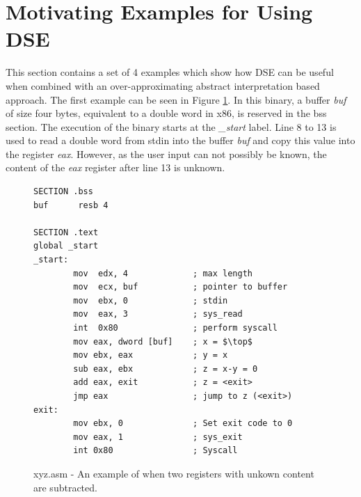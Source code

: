 \documentclass{kththesis}
\newcommand{\fbcomment}[1]{{#1}}
\renewcommand{\fbcomment}[1]{}
\renewcommand{\it}[1]{\textit{#1}}
\begin{document}


\section{Motivating Examples for Using DSE}\label{sec:MotExamples}
\fbcomment{\color{red}Goal: Provide 4 examples of when DSE can be useful. (Ex 1: A case that can be handled by DSE but not Jakstab. Ex 2: Why it is important to alternate multiple times between under and over-approximation, Ex 3: Why the second version has higher coverage. Ex 4: That the under-approximation can be useful even when there is a true top in a binary)}
This section contains a set of 4 examples which show how DSE can be useful when combined with an over-approximating abstract interpretation based approach. The first example can be seen in Figure \ref{fig:xyz.asm}. In this binary, a buffer \it{buf} of size four bytes, equivalent to a double word in x86, is reserved in the bss section. The execution of the binary starts at the \it{\_start} label. Line 8 to 13 is used to read a double word from stdin into the buffer \it{buf} and copy this value into the register \it{eax}. However, as the user input can not possibly be known, the content of the \it{eax} register after line 13 is unknown.
\begin{figure}[ht]
    \centering
\begin{tcolorbox}
\begin{verbatim}
SECTION .bss
buf      resb 4

SECTION .text
global _start
_start:
        mov  edx, 4             ; max length
        mov  ecx, buf           ; pointer to buffer
        mov  ebx, 0             ; stdin
        mov  eax, 3             ; sys_read
        int  0x80               ; perform syscall
        mov eax, dword [buf]    ; x = $\top$
        mov ebx, eax            ; y = x
        sub eax, ebx            ; z = x-y = 0
        add eax, exit           ; z = <exit>
        jmp eax                 ; jump to z (<exit>)
exit:
        mov ebx, 0              ; Set exit code to 0
        mov eax, 1              ; sys_exit
        int 0x80                ; Syscall
\end{verbatim}
\end{tcolorbox}
\caption{xyz.asm - An example of when two registers with unkown content are subtracted.}
    \label{fig:xyz.asm}
\end{figure}
\end{document}
